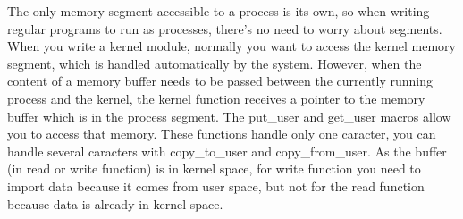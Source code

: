 \documentclass[11pt]{article}
\begin{document}
The only memory segment accessible to a process is its own, so when writing regular programs to run as processes, there's no need to worry about segments. When you write a kernel module, normally you want to access the kernel memory segment, which is handled automatically by the system. However, when the content of a memory buffer needs to be passed between the currently running process and the kernel, the kernel function receives a pointer to the memory buffer which is in the process segment. The put\_user and get\_user macros allow you to access that memory. These functions handle only one caracter, you can handle several caracters with copy\_to\_user and copy\_from\_user. As the buffer (in read or write function) is in kernel space, for write function you need to import data because it comes from user space, but not for the read function because data is already in kernel space.
\end{document}

